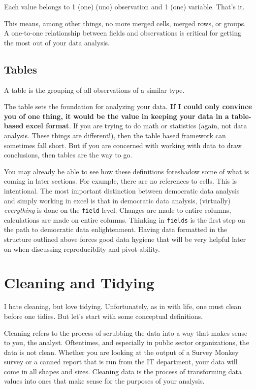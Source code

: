 \documentclass[
]{book}
\begin{document}
Each value belongs to 1 (one) (uno) observation and 1 (one) variable. That's it.

This means, among other things, no more merged cells, merged rows, or groups. A one-to-one relationship between fields and observations is critical for getting the most out of your data analysis.

\hypertarget{tables}{%
\subsection{Tables}\label{tables}}

A table is the grouping of all observations of a similar type.

The table sets the foundation for analyzing your data. \textbf{If I could only convince you of one thing, it would be the value in keeping your data in a table-based excel format}. If you are trying to do math or statistics (again, not data analysis. These things are different!), then the table based framework can sometimes fall short. But if you are concerned with working with data to draw conclusions, then tables are the way to go.

You may already be able to see how these definitions foreshadow some of what is coming in later sections. For example, there are no references to cells. This is intentional. The most important distinction between democratic data analysis and simply working in excel is that in democratic data analysis, (virtually) \emph{everything} is done on the \texttt{field} level. Changes are made to entire columns, calculations are made on entire columns. Thinking in \texttt{fields} is the first step on the path to democratic data enlightenment. Having data formatted in the structure outlined above forces good data hygiene that will be very helpful later on when discussing reproduciblity and pivot-ability.

\hypertarget{cleaning-and-tidying}{%
\section{Cleaning and Tidying}\label{cleaning-and-tidying}}

I hate cleaning, but love tidying. Unfortunately, as in with life, one must clean before one tidies. But let's start with some conceptual definitions.

Cleaning refers to the process of scrubbing the data into a way that makes sense to you, the analyst. Oftentimes, and especially in public sector organizations, the data is not clean. Whether you are looking at the output of a Survey Monkey survey or a canned report that is run from the IT department, your data will come in all shapes and sizes. Cleaning data is the process of transforming data values into ones that make sense for the purposes of your analysis.
\end{document}
